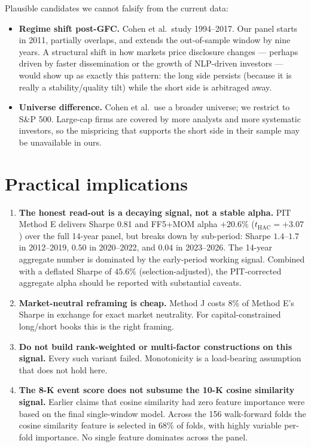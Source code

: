\documentclass[11pt]{article}
\begin{document}
Plausible candidates we cannot falsify from the current data:

\begin{itemize}
\item \textbf{Regime shift post-GFC.} Cohen et al.\ study 1994--2017. Our
  panel starts in 2011, partially overlaps, and extends the out-of-sample
  window by nine years. A structural shift in how markets price disclosure
  changes --- perhaps driven by faster dissemination or the growth of
  NLP-driven investors --- would show up as exactly this pattern: the long
  side persists (because it is really a stability/quality tilt) while the
  short side is arbitraged away.
\item \textbf{Universe difference.} Cohen et al.\ use a broader universe; we
  restrict to S\&P 500. Large-cap firms are covered by more analysts and
  more systematic investors, so the mispricing that supports the short side
  in their sample may be unavailable in ours.
\end{itemize}

\section{Practical implications}

\begin{enumerate}
\item \textbf{The honest read-out is a decaying signal, not a stable alpha.}
  PIT Method E delivers Sharpe 0.81 and FF5+MOM alpha $+20.6\%$
  ($t_{\text{HAC}} = +3.07$) over the full 14-year panel, but breaks down
  by sub-period: Sharpe $1.4$--$1.7$ in 2012--2019, $0.50$ in 2020--2022,
  and $0.04$ in 2023--2026. The 14-year aggregate number is dominated by
  the early-period working signal. Combined with a deflated Sharpe of
  $45.6\%$ (selection-adjusted), the PIT-corrected aggregate alpha should
  be reported with substantial caveats.
\item \textbf{Market-neutral reframing is cheap.} Method J costs 8\% of
  Method E's Sharpe in exchange for exact market neutrality. For
  capital-constrained long/short books this is the right framing.
\item \textbf{Do not build rank-weighted or multi-factor constructions on
  this signal.} Every such variant failed. Monotonicity is a load-bearing
  assumption that does not hold here.
\item \textbf{The 8-K event score does not subsume the 10-K cosine
  similarity signal.} Earlier claims that cosine similarity had zero feature
  importance were based on the final single-window model. Across the 156
  walk-forward folds the cosine similarity feature is selected in 68\% of
  folds, with highly variable per-fold importance. No single feature
  dominates across the panel.
\end{enumerate}
\end{document}
